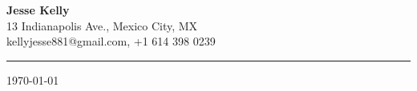 \documentclass[letterpaper,11pt]{article}
\begin{document}
\begin{center}
\Large\textbf{Jesse Kelly} \\
13 Indianapolis Ave., Mexico City, MX \\
kellyjesse881@gmail.com, +1 614 398 0239
\end{center}
\noindent\rule{\textwidth}{1pt}

\hfill \today
\end{document}

